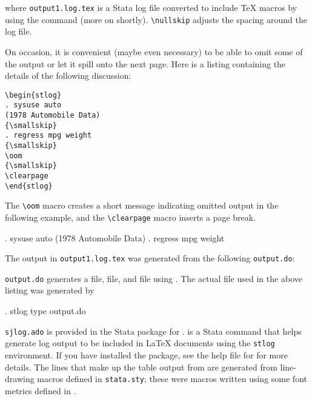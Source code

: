 \noindent
where \texttt{output1.log.tex} is a Stata log file converted to include \TeX{}
macros by using the  command (more on  shortly).
\verb+\nullskip+ adjusts the spacing around the log file.

\clearpage
On occasion, it is convenient (maybe even necessary) to be able to omit some of
the output or let it spill onto the next page.  Here is a listing containing
the details of the following discussion:

\begin{stverbatim}
\begin{verbatim}
\begin{stlog}
. sysuse auto
(1978 Automobile Data)
{\smallskip}
. regress mpg weight
{\smallskip}
\oom
{\smallskip}
\clearpage
\end{stlog}
\end{verbatim}
\end{stverbatim}

The \verb+\oom+ macro creates
a short message indicating omitted output in the following example, and the
\verb+\clearpage+ macro inserts a page break.

\begin{stlog}
. sysuse auto
(1978 Automobile Data)
{\smallskip}
. regress mpg weight
{\smallskip}
\oom
{\smallskip}
\clearpage
\end{stlog}

The output in \texttt{output1.log.tex} was generated from the following
\texttt{output.do}:

\begin{stlog}

\end{stlog}

\noindent
\texttt{output.do} generates a  file,  file,
and  file using .  The actual file used in the
above listing was generated by

\begin{stlog}
. stlog type output.do
\end{stlog}

\texttt{sjlog.ado} is provided in the Stata package for .
 is a Stata command that helps generate log output to be included
in {\LaTeX} documents using the \texttt{stlog} environment.  If you have
installed the  package, see the help file for  for
more details.  The lines that make up the table output from 
are generated from line-drawing macros defined in \texttt{stata.sty}; these
were macros written using some font metrics defined in \citet{texbook}.

